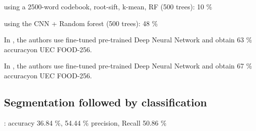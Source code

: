 using a 2500-word codebook, root-sift, k-mean, RF (500 trees): 10 \% 

using the CNN + Random forest (500 trees): 48 \%

In \cite{Bolanos2016}, the authors use fine-tuned pre-trained Deep Neural Network and obtain 63 \% accuracyon UEC FOOD-256.

In \cite{Yanai2015}, the authors use fine-tuned pre-trained Deep Neural Network and obtain 67 \% accuracyon UEC FOOD-256.


\subsection{Segmentation followed by classification}

\cite{Bolanos2016} : accuracy 36.84 \%, 54.44 \% precision, Recall 50.86 \%
